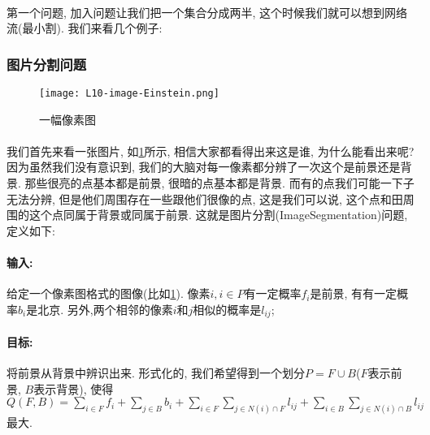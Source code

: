         \paragraph{} 第一个问题, 加入问题让我们把一个集合分成两半, 这个时候我们就可以想到网络流(最小割). 我们来看几个例子:
        \subsubsection{图片分割问题}
\begin{figure}[h]
                 \centering
                 \texttt{[image: L10-image-Einstein.png]}
                 \caption{一幅像素图}
                 \label{Figure: image_segmentation_einstein_pixel}
             \end{figure}
\paragraph{}我们首先来看一张图片, 如\figurename\ref{Figure: image_segmentation_einstein_pixel}所示, 相信大家都看得出来这是谁, 为什么能看出来呢? 因为虽然我们没有意识到, 我们的大脑对每一像素都分辨了一次这个是前景还是背景. 那些很亮的点基本都是前景, 很暗的点基本都是背景. 而有的点我们可能一下子无法分辨, 但是他们周围存在一些跟他们很像的点, 这是我们可以说, 这个点和田周围的这个点同属于背景或同属于前景. 这就是图片分割({\sc ImageSegmentation})问题, 定义如下:
            \paragraph{输入:} 给定一个像素图格式的图像(比如\figurename\ref{Figure: image_segmentation_einstein_pixel}). 像素$i, i\in P$有一定概率$f_i$是前景, 有有一定概率$b_i$是北京. 另外,两个相邻的像素$i$和$j$相似的概率是$l_{ij}$;
            \paragraph{目标:}将前景从背景中辨识出来. 形式化的, 我们希望得到一个划分$P=F\cup B$($F$表示前景, $B$表示背景), 使得$Q(F, B) = \sum_{i\in F} f_i + \sum_{j\in B} b_i + \sum_{i \in F}\sum_{j \in N(i)\cap F} l_{ij} + \sum_{i \in B}\sum_{j \in N(i)\cap B} l_{ij}$最大.
